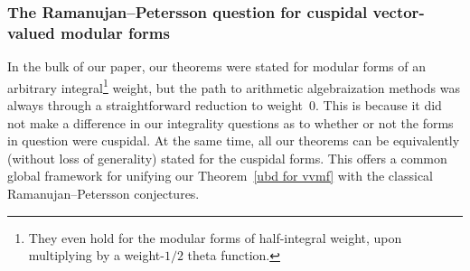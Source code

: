 \documentclass[10pt]{amsart}
\theoremstyle{remark}
\numberwithin{equation}{subsection}
\begin{document}
\subsubsection{The Ramanujan--Petersson question for cuspidal vector-valued modular forms} \label{Ramanujan query} In the bulk of our paper, our theorems were stated for modular forms of an arbitrary integral\footnote{They even hold for the modular forms of half-integral weight, upon multiplying by a weight-$1/2$ theta function.} weight, but the path to arithmetic algebraization methods was always through a straightforward reduction to weight~$0$.  This is because it did not make a difference in our integrality questions as to whether or not the forms in question were cuspidal. At the same time, all our theorems can be equivalently (without loss of generality) stated for the cuspidal forms. This offers a common global framework for unifying our Theorem~\ref{ubd for vvmf} with the classical Ramanujan--Petersson conjectures. 
\end{document}

